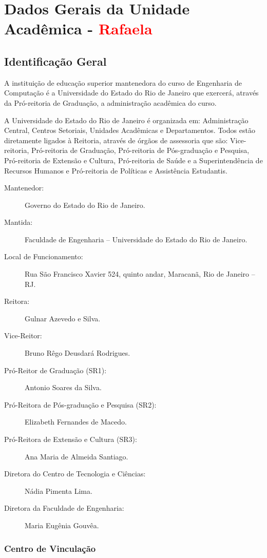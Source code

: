 \chapter{Dados Gerais da Unidade Acadêmica - \textcolor{red}{Rafaela}}


\section{Identificação Geral}

A instituição de educação superior mantenedora do curso de Engenharia de Computação é a Universidade do Estado do Rio de Janeiro que exercerá, através da Pró-reitoria de Graduação, a administração acadêmica do curso.

A Universidade do Estado do Rio de Janeiro é organizada em: Administração Central, Centros Setoriais, Unidades Acadêmicas e Departamentos. Todos estão diretamente ligados à Reitoria, através de órgãos de assessoria que são: Vice-reitoria, Pró-reitoria de Graduação, Pró-reitoria de Pós-graduação e Pesquisa, Pró-reitoria de Extensão e Cultura, Pró-reitoria de Saúde e a Superintendência de Recursos Humanos e Pró-reitoria de Políticas e Assistência Estudantis.


\begin{description}
	\item[Mantenedor:] Governo do Estado do Rio de Janeiro.
	\item [Mantida:] Faculdade de Engenharia -- Universidade do Estado do Rio de Janeiro.
	\item [Local de Funcionamento:] Rua São Francisco Xavier 524, quinto andar, Maracanã, Rio de Janeiro -- RJ.
	\item [Reitora:] Gulnar Azevedo e Silva.
	\item [Vice-Reitor:] Bruno Rêgo Deusdará Rodrigues.
	\item [Pró-Reitor de Graduação (SR1):] Antonio Soares da Silva.
	\item [Pró-Reitora de Pós-graduação e Pesquisa (SR2):] Elizabeth Fernandes de Macedo.
	\item [Pró-Reitora de Extensão e Cultura (SR3):] Ana Maria de Almeida Santiago.
	\item [Diretora do Centro de Tecnologia e Ciências:] Nádia Pimenta Lima.
	\item [Diretora da Faculdade de Engenharia:]  Maria Eugênia Gouvêa.
\end{description}

\subsection{Centro de Vinculação}

